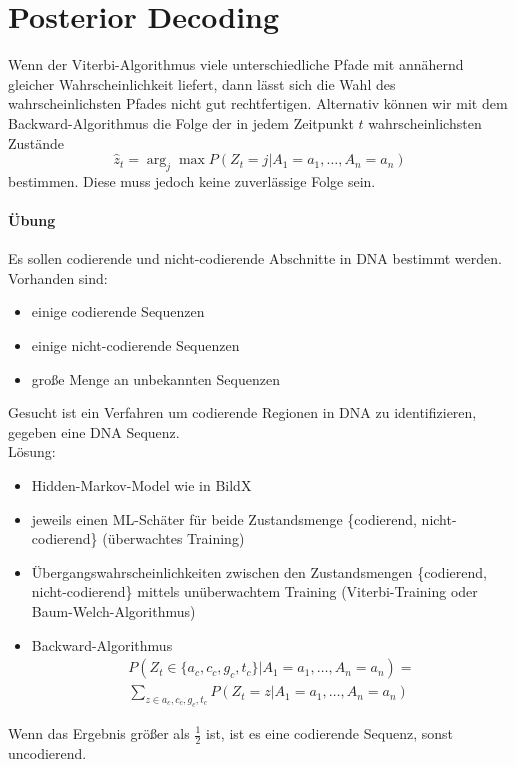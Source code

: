 \section{Posterior Decoding}
Wenn der Viterbi-Algorithmus viele unterschiedliche Pfade mit annähernd gleicher Wahrscheinlichkeit liefert, dann lässt sich die Wahl des wahrscheinlichsten Pfades nicht gut rechtfertigen.
Alternativ können wir mit dem Backward-Algorithmus die Folge der in jedem
Zeitpunkt $t$ wahrscheinlichsten Zustände
\[ \hat z_{t} = \arg_{j}\max P(Z_{t} = j | A_{1} = a_{1}, \ldots, A_{n} = a_{n}) \]
bestimmen.
Diese muss jedoch keine zuverlässige Folge sein.

\begin{shaded}
\paragraph{Übung}
\label{par:ubung}

Es sollen codierende und nicht-codierende Abschnitte in DNA bestimmt werden.
Vorhanden sind:
\begin{itemize}
    \item einige codierende Sequenzen
    \item einige nicht-codierende Sequenzen
    \item große Menge an unbekannten Sequenzen
\end{itemize}
Gesucht ist ein Verfahren um codierende Regionen in DNA zu identifizieren,
gegeben eine DNA Sequenz.\\
Lösung:
\begin{itemize}
    \item Hidden-Markov-Model wie in BildX
    \item jeweils einen ML-Schäter für beide Zustandsmenge \{codierend,
        nicht-codierend\} (überwachtes Training)
    \item Übergangswahrscheinlichkeiten zwischen den Zustandsmengen \{codierend,
        nicht-codierend\} mittels unüberwachtem Training (Viterbi-Training oder
        Baum-Welch-Algorithmus)
    \item Backward-Algorithmus
        \begin{align*}
            P(Z_t \in \{a_c,c_c,g_c,t_c\} | A_1=a_1,\ldots,A_n=a_n)=\\
            \sum\limits_{z\in a_c,c_c,g_c,t_c} P(Z_t=z|A_1=a_1,\ldots,A_n=a_n)
        \end{align*}
\end{itemize}
Wenn das Ergebnis größer als $\frac{1}{2}$ ist, ist es eine codierende Sequenz,
sonst uncodierend.
\end{shaded}

